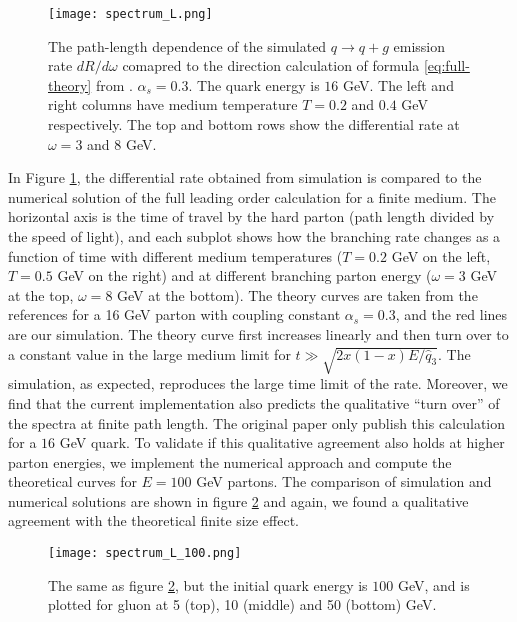 \begin{figure}
\centering
\texttt{[image: spectrum\_L.png]}
\caption{The path-length dependence of the simulated $q\rightarrow q+g$ emission rate $dR/d\omega$ comapred to the direction calculation of formula \ref{eq:full-theory} from \cite{CaronHuot:2010bp}. $\alpha_s = 0.3$. The quark energy is $16$ GeV. The left and right columns have medium temperature $T=0.2$ and $0.4$ GeV respectively. The top and bottom rows show the differential rate at $\omega = 3$ and $8$ GeV.}
\label{fig:spectra-L-alphas=0.3}
\end{figure}

In Figure \ref{fig:spectra-L-alphas=0.3}, the differential rate obtained from simulation is compared to the numerical solution of the full leading order calculation for a finite medium.
The horizontal axis is the time of travel by the hard parton (path length divided by the speed of light), and each subplot shows how the branching rate changes as a function of time with different medium temperatures ($T=0.2$ GeV on the left, $T=0.5$ GeV on the right) and at different branching parton energy ($\omega=3$ GeV at the top, $\omega=8$ GeV at the bottom).
The theory curves are taken from the references \cite{CaronHuot:2010bp} for a 16 GeV parton with coupling constant $\alpha_s = 0.3$, and the red lines are our simulation.
The theory curve first increases linearly and then turn over to a constant value in the large medium limit for $t \gg \sqrt{2x(1-x)E/\hat{q}_3}$.
The simulation, as expected, reproduces the large time limit of the rate.
Moreover, we find that the current implementation also predicts the qualitative ``turn over'' of the spectra at finite path length.
The original paper only publish this calculation for a $16$ GeV quark. 
To validate if this qualitative agreement also holds at higher parton energies, we implement the numerical approach \cite{CaronHuot:2010bp} and compute the theoretical curves for $E=100$ GeV partons.
The comparison of simulation and numerical solutions are shown in figure \ref{fig:spectra-L-alphas=0.3-E100} and again, we found a qualitative agreement with the theoretical finite size effect.

\begin{figure}
\centering
\texttt{[image: spectrum\_L\_100.png]}
\caption{The same as figure \ref{fig:spectra-L-alphas=0.3-E100}, but the initial quark energy is $100$ GeV, and is plotted for gluon at 5 (top), 10 (middle) and 50 (bottom) GeV.}
\label{fig:spectra-L-alphas=0.3-E100}
\end{figure}

